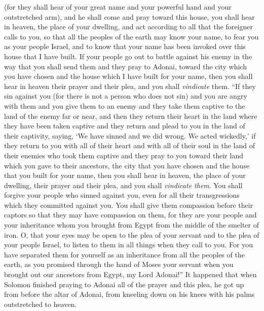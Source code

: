 \begin{biblechapter}
\verse (for they shall hear of your great name and your powerful hand and your outstretched arm), and he shall come and pray toward this house,
\verse you shall hear in heaven, the place of your dwelling, and act according to all that the foreigner calls to you, so that all the peoples of the earth may know your name, to fear you as your people Israel, and to know that your name has been invoked over this house that I have built.
\verse If your people go out to battle against his enemy in the way that you shall send them and they pray to Adonai, toward the city which you have chosen and the house which I have built for your name,
\verse then you shall hear in heaven their prayer and their plea, and you shall \textit{vindicate} them.
\verse “If they sin against you (for there is not a person who does not sin) and you are angry with them and you give them to an enemy and they take them captive to the land of the enemy far or near,
\verse and then they return their heart in the land where they have been taken captive and they return and plead to you in the land of their captivity, saying, ‘We have sinned and we did wrong. We acted wickedly,’
\verse if they return to you with all of their heart and with all of their soul in the land of their enemies who took them captive and they pray to you toward their land which you gave to their ancestors, the city that you have chosen and the house that you built for your name,
\verse then you shall hear in heaven, the place of your dwelling, their prayer and their plea, and you shall \textit{vindicate them}.
\verse You shall forgive your people who sinned against you, even for all their transgressions which they committed against you. You shall give them compassion before their captors so that they may have compassion on them,
\verse for they are your people and your inheritance whom you brought from Egypt from the middle of the smelter of iron.
\verse O, that your eyes may be open to the plea of your servant and to the plea of your people Israel, to listen to them in all things when they call to you.
\verse For you have separated them for yourself as an inheritance from all the peoples of the earth, as you promised through the hand of Moses your servant when you brought out our ancestors from Egypt, my Lord Adonai!”
 It happened that when Solomon finished praying to Adonai all of the prayer and this plea, he got up from before the altar of Adonai, from kneeling down on his knees with his palms outstretched to heaven.

\end{biblechapter}
